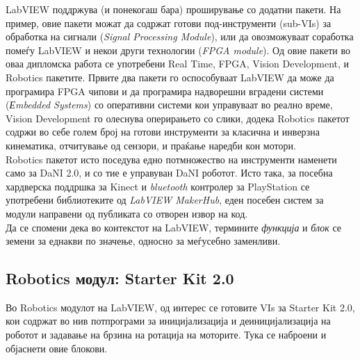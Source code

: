 \documentclass[11pt]{article}
\begin{document}
  LabVIEW поддржува (и понекогаш бара) проширување со додатни пакети. На пример, овие пакети можат да содржат готови под-инструменти (sub-VIs) за обработка на сигнали (\textit{Signal Processing Module}), или да овозможуваат соработка помеѓу LabVIEW и некои други технологии (\textit{FPGA module}). Од овие пакети во оваа дипломска работа се употребени Real Time, FPGA, Vision Development, и Robotics пакетите. Првите два пакети го оспособуваат LabVIEW да може да програмира FPGA чипови и да програмира надворешни вградени системи (\textit{Еmbedded Systems}) со оперативни системи кои управуваат во реално време, Vision Development го олеснува оперирањето со слики, додека Robotics пакетот содржи во себе голем број на готови инструменти за класична и инверзна кинематика, отчитување од сензори, и праќање наредби кон мотори.
  \\
  Robotics пакетот исто поседува едно потмножество на инструменти наменети само за DaNI 2.0, и со тие е управуван DaNI роботот. Исто така, за посебна хардверска поддршка за Kinect и \textit{bluetooth} контролер за PlayStation се употребени библиотеките од \textit{LabVIEW MakerHub}, еден посебен систем за модули направени од публиката со отворен извор на код.
  \\
  Да се спомени дека во контекстот на LabVIEW, термините \textit{функција} и \textit{блок} се земени за еднакви по значење, односно за меѓусебно заменливи.

  \subsection{Robotics модул: Starter Kit 2.0}
    Во Robotics модулот на LabVIEW, од интерес се готовите VIs за Starter Kit 2.0, кои содржат во нив потпрограми за иницијализација и деиницијализација на роботот и задавање на брзина на ротација на моторите. Тука се наброени и објаснети овие блокови.
\end{document}

